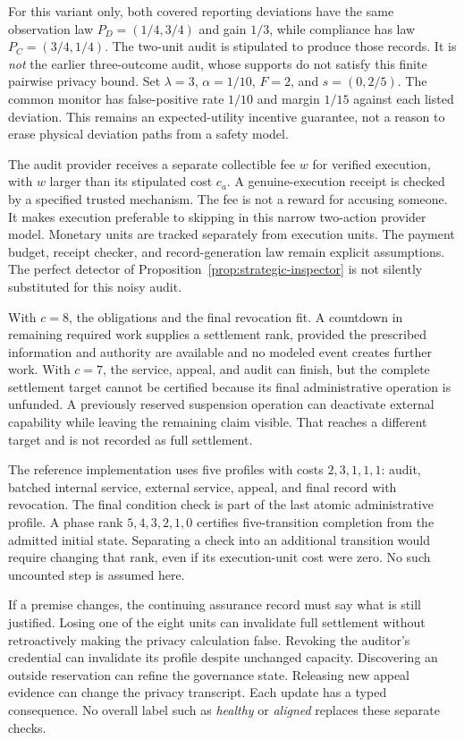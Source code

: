 \documentclass[11pt,letterpaper]{article}
\theoremstyle{plain}
\theoremstyle{definition}
\theoremstyle{remark}
\begin{document}
For this variant only, both covered reporting deviations have the same observation law $P_D=(1/4,3/4)$ and gain $1/3$, while compliance has law $P_C=(3/4,1/4)$. The two-unit audit is stipulated to produce those records. It is \emph{not} the earlier three-outcome audit, whose supports do not satisfy this finite pairwise privacy bound. Set $\lambda=3$, $\alpha=1/10$, $F=2$, and $s=(0,2/5)$. The common monitor has false-positive rate $1/10$ and margin $1/15$ against each listed deviation. This remains an expected-utility incentive guarantee, not a reason to erase physical deviation paths from a safety model.

The audit provider receives a separate collectible fee $w$ for verified execution, with $w$ larger than its stipulated cost $c_a$. A genuine-execution receipt is checked by a specified trusted mechanism. The fee is not a reward for accusing someone. It makes execution preferable to skipping in this narrow two-action provider model. Monetary units are tracked separately from execution units. The payment budget, receipt checker, and record-generation law remain explicit assumptions. The perfect detector of Proposition~\ref{prop:strategic-inspector} is not silently substituted for this noisy audit.

With $c=8$, the obligations and the final revocation fit. A countdown in remaining required work supplies a settlement rank, provided the prescribed information and authority are available and no modeled event creates further work. With $c=7$, the service, appeal, and audit can finish, but the complete settlement target cannot be certified because its final administrative operation is unfunded. A previously reserved suspension operation can deactivate external capability while leaving the remaining claim visible. That reaches a different target and is not recorded as full settlement.

The reference implementation uses five profiles with costs $2,3,1,1,1$: audit, batched internal service, external service, appeal, and final record with revocation. The final condition check is part of the last atomic administrative profile. A phase rank $5,4,3,2,1,0$ certifies five-transition completion from the admitted initial state. Separating a check into an additional transition would require changing that rank, even if its execution-unit cost were zero. No such uncounted step is assumed here.

If a premise changes, the continuing assurance record must say what is still justified. Losing one of the eight units can invalidate full settlement without retroactively making the privacy calculation false. Revoking the auditor's credential can invalidate its profile despite unchanged capacity. Discovering an outside reservation can refine the governance state. Releasing new appeal evidence can change the privacy transcript. Each update has a typed consequence. No overall label such as \emph{healthy} or \emph{aligned} replaces these separate checks.
\end{document}

